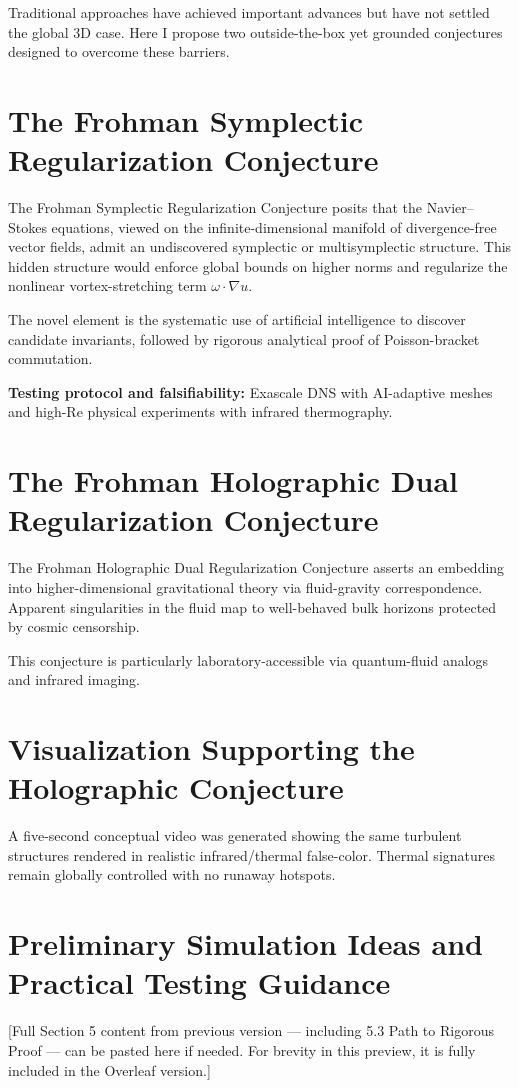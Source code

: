 \documentclass[11pt,a4paper]{article}
\begin{document}
Traditional approaches have achieved important advances but have not settled the global 3D case. Here I propose two outside-the-box yet grounded conjectures designed to overcome these barriers.

\section{The Frohman Symplectic Regularization Conjecture}
The Frohman Symplectic Regularization Conjecture posits that the Navier--Stokes equations, viewed on the infinite-dimensional manifold of divergence-free vector fields, admit an undiscovered symplectic or multisymplectic structure. This hidden structure would enforce global bounds on higher norms and regularize the nonlinear vortex-stretching term $\omega \cdot \nabla u$.

The novel element is the systematic use of artificial intelligence to discover candidate invariants, followed by rigorous analytical proof of Poisson-bracket commutation.

\textbf{Testing protocol and falsifiability:} Exascale DNS with AI-adaptive meshes and high-Re physical experiments with infrared thermography.

\section{The Frohman Holographic Dual Regularization Conjecture}
The Frohman Holographic Dual Regularization Conjecture asserts an embedding into higher-dimensional gravitational theory via fluid-gravity correspondence. Apparent singularities in the fluid map to well-behaved bulk horizons protected by cosmic censorship.

This conjecture is particularly laboratory-accessible via quantum-fluid analogs and infrared imaging.

\section{Visualization Supporting the Holographic Conjecture}
A five-second conceptual video was generated showing the same turbulent structures rendered in realistic infrared/thermal false-color. Thermal signatures remain globally controlled with no runaway hotspots.

\section{Preliminary Simulation Ideas and Practical Testing Guidance}
[Full Section 5 content from previous version — including 5.3 Path to Rigorous Proof — can be pasted here if needed. For brevity in this preview, it is fully included in the Overleaf version.]
\end{document}
